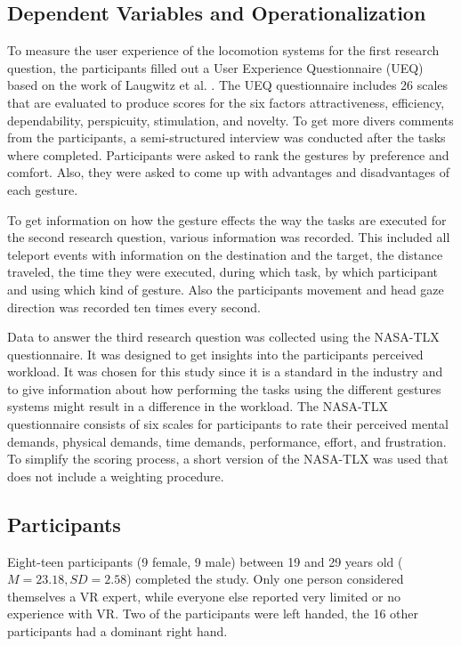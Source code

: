 \subsection{Dependent Variables and Operationalization}
To measure the user experience of the locomotion systems for the first research question, the participants filled out a User Experience Questionnaire (UEQ) based on the work of Laugwitz et al. \cite{Laugwitz2008}. The UEQ questionnaire includes 26 scales that are evaluated to produce scores for the six factors attractiveness, efficiency, dependability, perspicuity, stimulation, and novelty. 
To get more divers comments from the participants, a semi-structured interview was conducted after the tasks where completed. Participants were asked to rank the gestures by preference and comfort. Also, they were asked to come up with advantages and disadvantages of each gesture.

To get information on how the gesture effects the way the tasks are executed for the second research question, various information was recorded. This included all teleport events with information on the destination and the target, the distance traveled, the time they were executed, during which task, by which participant and using which kind of gesture. Also the participants movement and head gaze direction was recorded ten times every second.  

Data to answer the third research question was collected using the NASA-TLX questionnaire. %
It was designed to get insights into the participants perceived workload. It was chosen for this study since it is a standard in the industry and to give information about how performing the tasks using the different gestures systems might result in a difference in the workload. The NASA-TLX questionnaire consists of six scales for participants to rate their perceived mental demands, physical demands, time demands, performance, effort, and frustration. To simplify the scoring process, a short version of the NASA-TLX was used that does not include a weighting procedure. %

\subsection{Participants}
Eight-teen participants (9 female, 9 male) between 19 and 29 years old ($M=23.18,SD=2.58$) completed the study. Only one person considered themselves a VR expert, while everyone else reported very limited or no experience with VR. Two of the participants were left handed, the 16 other participants had a dominant right hand. 

